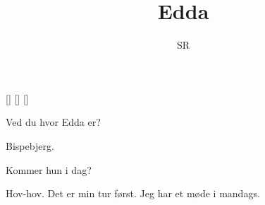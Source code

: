 \documentclass[a4paper,11pt]{article}
\title{Edda}
\author{SR}
\begin{document}
\maketitle

\begin{roles}
[]
[]
[]
\end{roles}

\begin{sketch}

 Ved du hvor Edda er?

 Bispebjerg.

 Kommer hun i dag?

 Hov-hov.  Det er min tur først.  Jeg har et møde i mandags.

\end{sketch}
\end{document}
